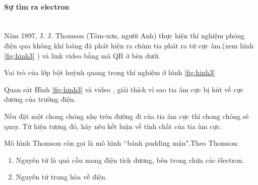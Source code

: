 \paragraph{Sự tìm ra electron}
\\
Năm 1897, J. J. Thomson (Tôm-xơn, người Anh) thực hiện thí nghiệm phóng điện qua không khí loãng đã phát hiện ra chùm tia phát ra từ cực âm.(xem hình \ref{fig:hinh3} ) và link video bằng mã QR ở bên dưới.\\ 
	





\begin{hoivadap}
	Vai trò của lớp bột huỳnh quang trong thí nghiệm ở hình \ref{fig:hinh3}
\end{hoivadap}

\begin{hoivadap}
Quan sát Hình \ref{fig:hinh3} và video , giải thích vì sao tia âm cực bị hút về cực dương của trường điện.
\end{hoivadap}

\begin{hoivadap}
	Nếu đặt một chong chóng nhẹ trên đường đi của tia âm cực thì chong chóng sẽ quay. Từ hiện tượng đó, hãy nêu kết luận về tính chất của tia âm cực.
\end{hoivadap}
\newpage
\vspace*{6pt}
\begin{emcobiet}
	 Mô hình Thomson còn gọi là mô hình \lq\lq bánh pudding mận".Theo Thomson:
	\begin{enumerate}
		\item Nguyên tử là quả cầu mang điện tích dương, bên trong chứa các êlectron.
	    \item Nguyên tử trung hòa về điện.
	\end{enumerate}

\end{emcobiet}



